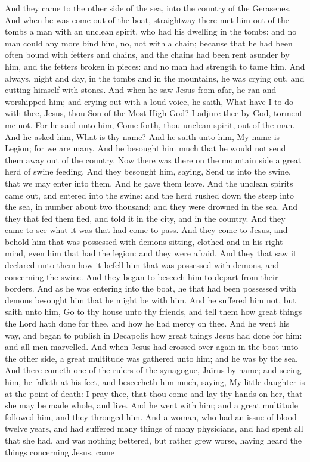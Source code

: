 And they came to the other side of the sea, into the country of the Gerasenes. And when he was come out of the boat, straightway there met him out of the tombs a man with an unclean spirit, who had his dwelling in the tombs: and no man could any more bind him, no, not with a chain; because that he had been often bound with fetters and chains, and the chains had been rent asunder by him, and the fetters broken in pieces: and no man had strength to tame him. And always, night and day, in the tombs and in the mountains, he was crying out, and cutting himself with stones. And when he saw Jesus from afar, he ran and worshipped him; and crying out with a loud voice, he saith, What have I to do with thee, Jesus, thou Son of the Most High God? I adjure thee by God, torment me not. For he said unto him, Come forth, thou unclean spirit, out of the man. And he asked him, What is thy name? And he saith unto him, My name is Legion; for we are many. And he besought him much that he would not send them away out of the country. Now there was there on the mountain side a great herd of swine feeding. And they besought him, saying, Send us into the swine, that we may enter into them. And he gave them leave. And the unclean spirits came out, and entered into the swine: and the herd rushed down the steep into the sea, in number about two thousand; and they were drowned in the sea. And they that fed them fled, and told it in the city, and in the country. And they came to see what it was that had come to pass. And they come to Jesus, and behold him that was possessed with demons sitting, clothed and in his right mind, even him that had the legion: and they were afraid. And they that saw it declared unto them how it befell him that was possessed with demons, and concerning the swine. And they began to beseech him to depart from their borders. And as he was entering into the boat, he that had been possessed with demons besought him that he might be with him. And he suffered him not, but saith unto him, Go to thy house unto thy friends, and tell them how great things the Lord hath done for thee, and how he had mercy on thee. And he went his way, and began to publish in Decapolis how great things Jesus had done for him: and all men marvelled.  And when Jesus had crossed over again in the boat unto the other side, a great multitude was gathered unto him; and he was by the sea. And there cometh one of the rulers of the synagogue, Jaïrus by name; and seeing him, he falleth at his feet, and beseecheth him much, saying, My little daughter is at the point of death: I pray thee, that thou come and lay thy hands on her, that she may be made whole, and live. And he went with him; and a great multitude followed him, and they thronged him.  And a woman, who had an issue of blood twelve years, and had suffered many things of many physicians, and had spent all that she had, and was nothing bettered, but rather grew worse, having heard the things concerning Jesus, came 
